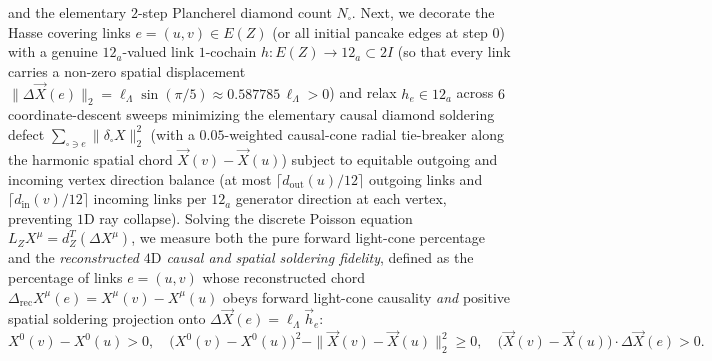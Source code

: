 \documentclass[11pt,a4paper]{article}
\theoremstyle{definition}
\theoremstyle{remark}
\begin{document}
\begin{enumerate}
    and the elementary $2$-step Plancherel diamond count $N_\square$. Next, we decorate the Hasse covering links $e = (u, v) \in E(Z)$ (or all initial pancake edges at step $0$) with a genuine $12_a$-valued link $1$-cochain $h : E(Z) \to 12_a \subset 2I$ (so that every link carries a non-zero spatial displacement $\|\Delta\vec{X}(e)\|_2 = \ell_\Lambda\sin(\pi/5) \approx 0.587785\,\ell_\Lambda > 0$) and relax $h_e \in 12_a$ across $6$ coordinate-descent sweeps minimizing the elementary causal diamond soldering defect $\sum_{\square \ni e} \|\delta_\square X\|_2^2$ (with a $0.05$-weighted causal-cone radial tie-breaker along the harmonic spatial chord $\vec{X}(v) - \vec{X}(u)$) subject to equitable outgoing and incoming vertex direction balance (at most $\lceil d_{\mathrm{out}}(u)/12\rceil$ outgoing links and $\lceil d_{\mathrm{in}}(v)/12\rceil$ incoming links per $12_a$ generator direction at each vertex, preventing $1\text{D}$ ray collapse). Solving the discrete Poisson equation $L_Z X^\mu = d_Z^T(\Delta X^\mu)$, we measure both the pure forward light-cone percentage and the \emph{reconstructed $4\text{D}$ causal and spatial soldering fidelity}, defined as the percentage of links $e = (u, v)$ whose reconstructed chord $\Delta_{\mathrm{rec}} X^\mu(e) = X^\mu(v) - X^\mu(u)$ obeys forward light-cone causality \emph{and} positive spatial soldering projection onto $\Delta\vec{X}(e) = \ell_\Lambda\vec{h}_e$:
    \begin{equation}
    \label{eq:lc_fidelity}
    X^0(v) - X^0(u) > 0, \quad \bigl(X^0(v) - X^0(u)\bigr)^2 - \|\vec{X}(v) - \vec{X}(u)\|_2^2 \ge 0, \quad \bigl(\vec{X}(v) - \vec{X}(u)\bigr)\cdot\Delta\vec{X}(e) > 0.
    \end{equation}
\end{enumerate}
\end{document}
